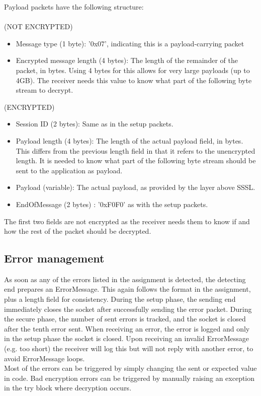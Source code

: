 \documentclass{article}
\begin{document}
Payload packets have the following structure: \\ \\
 (NOT ENCRYPTED)
\begin{itemize}
\item Message type (1 byte): '0x07', indicating this is a payload-carrying packet
\item Encrypted message length (4 bytes): The length of the remainder of the packet, in bytes. Using 4 bytes for this allows for very large payloads (up to 4GB). The receiver needs this value to know what part of the following byte stream to decrypt.
\end{itemize}
 (ENCRYPTED)
\begin{itemize}

\item Session ID (2 bytes): Same as in the setup packets.
\item Payload length (4 bytes): The length of the actual payload field, in bytes. This differs from the previous length field in that it refers to the unencrypted length. It is needed to know what part of the following byte stream should be sent to the application as payload.
\item Payload (variable): The actual payload, as provided by the layer above SSSL.
\item EndOfMessage (2 bytes) : '0xF0F0' as with the setup packets.
\end{itemize}

The first two fields are not encrypted as the receiver needs them to know if and how the rest of the packet should be decrypted.

\subsection{Error management}
As soon as any of the errors listed in the assignment is detected, the detecting end prepares an ErrorMessage. This again follows the format in the assignment, plus a length field for consistency. During the setup phase, the sending end immediately closes the socket after successfully sending the error packet. During the secure phase, the number of sent errors is tracked, and the socket is closed after the tenth error sent. When receiving an error, the error is logged and only in the setup phase the socket is closed. Upon receiving an invalid ErrorMessage (e.g. too short) the receiver will log this but will not reply with another error, to avoid ErrorMessage loops. \\ Most of the errors can be triggered by simply changing the sent or expected value in code. Bad encryption errors can be triggered by manually raising an exception in the try block where decryption occurs.
\end{document}
